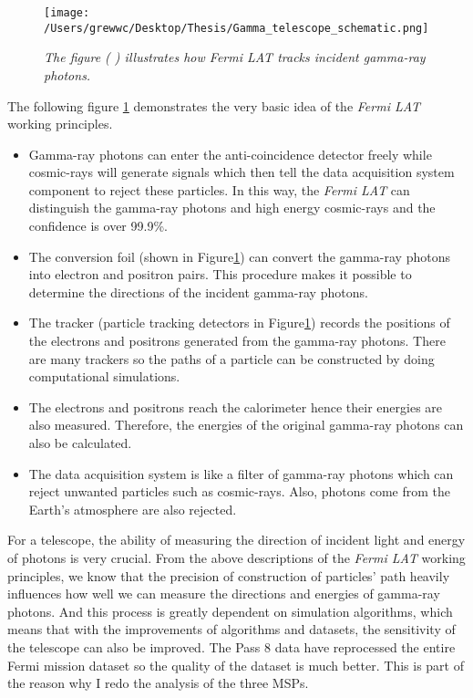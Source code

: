 \documentclass[12pt]{report}
\newcommand{\mycaption}[1]{\caption{\textit{\footnotesize #1}}}
\newcommand{\blackhref}[2]{
  \href{#1}{\color{black}{\textit{\small #2}}}
}
\begin{document}
        \begin{figure}[!ht]  
          \centering
              \texttt{[image: /Users/grewwc/Desktop/Thesis/Gamma\_telescope\_schematic.png]}
              \mycaption{The figure (\blackhref{https://www-glast.stanford.edu/instrument.html}{\scriptsize{https://www-glast.stanford.edu/instrument.html}})
                illustrates how \textit{Fermi LAT} tracks incident gamma-ray photons.}
              \label{fig:fermi schematic}
        \end{figure}
        The following figure \ref{fig:fermi schematic} demonstrates the very basic idea of the \textit{Fermi LAT}
        working principles. \\

        \begin{itemize}
          \item Gamma-ray photons can enter the anti-coincidence detector freely while cosmic-rays will generate
            signals which then tell the data acquisition system component to reject these particles. 
            In this way, the \textit{Fermi LAT} can distinguish the gamma-ray photons and high energy 
            cosmic-rays and the confidence is over 99.9\%. 
          \item The conversion foil (shown in Figure\ref{fig:fermi schematic}) can convert the 
            gamma-ray photons into electron and positron pairs. This procedure makes it possible to determine 
            the directions of the incident gamma-ray photons. 
          \item The tracker (particle tracking detectors in Figure\ref{fig:fermi schematic}) records the 
            positions of the electrons and positrons generated from the gamma-ray photons. There are many 
            trackers so the paths of a particle can be constructed by doing computational simulations.
          \item The electrons and positrons reach the calorimeter hence their energies are also measured.
            Therefore, the energies of the original gamma-ray photons can also be calculated. 
          \item The data acquisition system is like a filter of gamma-ray photons which can 
            reject unwanted particles such as cosmic-rays.
            Also, photons come from the Earth's atmosphere are also rejected. 
        \end{itemize}

        For a telescope, the ability of measuring the direction of incident light and energy of photons is very crucial. 
        From the above descriptions of the \textit{Fermi LAT} working principles, we know that the precision of 
        construction of particles' path heavily influences how well we can measure the directions and energies of 
        gamma-ray photons. 
        And this process is greatly dependent on simulation algorithms, which means that with the 
        improvements of algorithms and datasets,
        the sensitivity of the telescope can also be improved. The Pass 8 data 
        have reprocessed the entire Fermi mission dataset so the quality of the dataset is much better. 
        This is part of the reason why I redo the analysis of the three MSPs.
\end{document}
